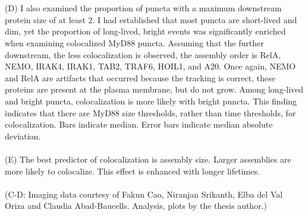 \begin{centering}
{\\
\\
(D) I also examined the proportion of puncta with a maximum downstream protein size of at least 2\times. I had established that most puncta are short-lived and dim, yet the proportion of long-lived, bright events was significantly enriched when examining colocalized MyD88 puncta. Assuming that the further downstream, the less colocalization is observed, the assembly order is RelA, NEMO, IRAK4, IRAK1, TAB2, TRAF6, HOIL1, and A20. Once again, NEMO and RelA are artifacts that occurred because the tracking is correct, these proteins are present at the plasma membrane, but do not grow. Among long-lived and bright puncta, colocalization is more likely with bright puncta. This finding indicates that there are MyD88 size thresholds, rather than time thresholds, for colocalization. Bars indicate median. Error bars indicate median absolute deviation.
\\
\\
(E) The best predictor of colocalization is assembly size. Larger assemblies are more likely to colocalize. This effect is enhanced with longer lifetimes.
\\
\\
(C-D: Imaging data courtesy of Fakun Cao, Niranjan Srikanth, Elba del Val Oriza and Claudia Abad-Baucells. Analysis, plots by the thesis author.)}
\label{p2:S2}
\end{centering}


